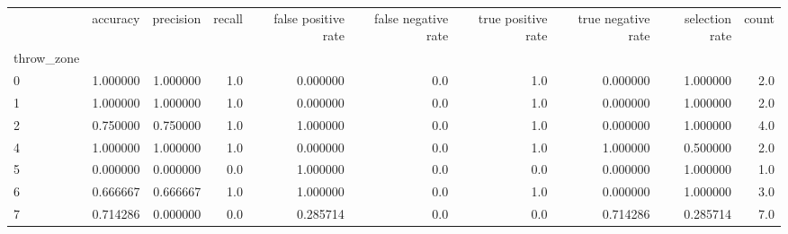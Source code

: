 \begin{tabular}{lrrrrrrrrr}
\toprule
{} &  accuracy &  precision &  recall &  false positive rate &  false negative rate &  true positive rate &  true negative rate &  selection rate &  count \\
throw\_zone &           &            &         &                      &                      &                     &                     &                 &        \\
\midrule
0          &  1.000000 &   1.000000 &     1.0 &             0.000000 &                  0.0 &                 1.0 &            0.000000 &        1.000000 &    2.0 \\
1          &  1.000000 &   1.000000 &     1.0 &             0.000000 &                  0.0 &                 1.0 &            0.000000 &        1.000000 &    2.0 \\
2          &  0.750000 &   0.750000 &     1.0 &             1.000000 &                  0.0 &                 1.0 &            0.000000 &        1.000000 &    4.0 \\
4          &  1.000000 &   1.000000 &     1.0 &             0.000000 &                  0.0 &                 1.0 &            1.000000 &        0.500000 &    2.0 \\
5          &  0.000000 &   0.000000 &     0.0 &             1.000000 &                  0.0 &                 0.0 &            0.000000 &        1.000000 &    1.0 \\
6          &  0.666667 &   0.666667 &     1.0 &             1.000000 &                  0.0 &                 1.0 &            0.000000 &        1.000000 &    3.0 \\
7          &  0.714286 &   0.000000 &     0.0 &             0.285714 &                  0.0 &                 0.0 &            0.714286 &        0.285714 &    7.0 \\
\bottomrule
\end{tabular}
